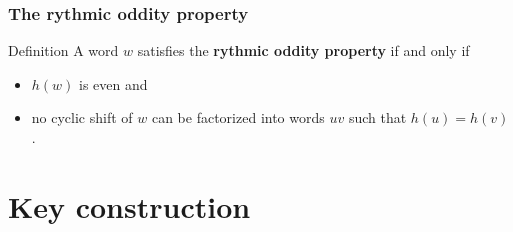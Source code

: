 \documentclass{beamer}
\theoremstyle{definition}
\begin{document}
\begin{frame}
\frametitle{The rythmic oddity property}
\begin{alertblock}{Definition}
A word $w$ satisfies the \textbf{rythmic oddity property} if and only if
\begin{itemize}
\item $h(w)$ is even and
\item no cyclic shift of $w$ can be factorized into words $uv$ such that $h(u)=h(v)$. 
\end{itemize}
\end{alertblock}
\end{frame}

%
%
%
%


\section{Key construction}
\end{document}
